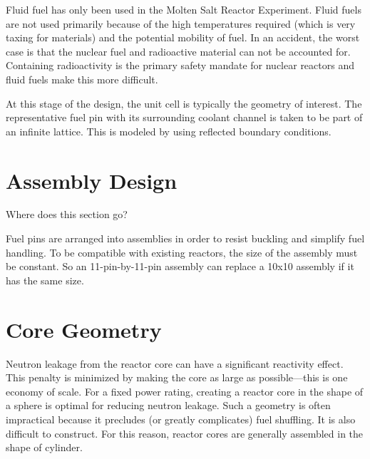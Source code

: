 
Fluid fuel has only been used in the Molten Salt Reactor Experiment. 
Fluid fuels are not used primarily because of the high temperatures required (which is very taxing for materials) and the potential mobility of fuel.
In an accident, the worst case is that the nuclear fuel and radioactive material can not be accounted for. Containing radioactivity is the primary safety mandate for nuclear reactors and fluid fuels make this more difficult.

At this stage of the design, the unit cell is typically the geometry of interest. 
The representative fuel pin with its surrounding coolant channel is taken to be part of an infinite lattice. This is modeled by using reflected boundary conditions.


\section{Assembly Design}
Where does this section go?

Fuel pins are arranged into assemblies in order to resist buckling and simplify fuel handling.
To be compatible with existing reactors, the size of the assembly must be constant.
So an 11-pin-by-11-pin assembly can replace a 10x10 assembly if it has the same size.

\section{Core Geometry}
Neutron leakage from the reactor core can have a significant reactivity effect.
This penalty is minimized by making the core as large as possible---this is one economy of scale. For a fixed power rating, creating a reactor core in the shape of a sphere is optimal for reducing neutron leakage.
Such a geometry is often impractical because it precludes (or greatly complicates) fuel shuffling. It is also difficult to construct.
For this reason, reactor cores are generally assembled in the shape of cylinder.


